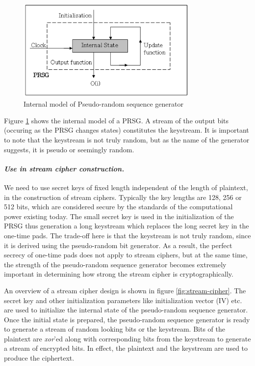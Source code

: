 \begin{figure}[ht!]
	\centering
		\includegraphics[width=3.5in]{./figures/prsg.PNG}
	\caption{Internal model of Pseudo-random sequence generator}	
	\label{fig:prsg}
\end{figure}

Figure \ref{fig:prsg} shows the internal model of a PRSG. A stream of the output bits (occuring as the PRSG changes states) constitutes the keystream. It is important to note that the keystream is not truly random, but as the name of the generator suggests, it is pseudo or seemingly random. 

\paragraph{\textit{Use in stream cipher construction.}}
\label{para:stream-construction} 
We need to use secret keys of fixed length independent of the length of plaintext, in the construction of stream ciphers. Typically the key lengths are 128, 256 or 512 bits, which are considered secure by the standards of the computational power existing today. %
The small secret key is used in the initialization of the PRSG thus generation a long keystream which replaces the long secret key in the one-time pads. The trade-off here is that the keystream is not truly random, since it is derived using the pseudo-random bit generator. As a result, the perfect secrecy of one-time pads does not apply to stream ciphers, but at the same time, the strength of the pseudo-random sequence generator becomes extremely important in determining how strong the stream cipher is cryptographically.

An overview of a stream cipher design is shown in figure \ref{fig:stream-cipher}. The secret key and other initialization parameters like initialization vector (IV) etc. are used to initialize the internal state of the pseudo-random sequence generator. Once the initial state is prepared, the pseudo-random sequence generator is ready to generate a stream of random looking bits or the keystream. Bits of the plaintext are \emph{xor}'ed along with corresponding bits from the keystream to generate a stream of encrypted bits. In effect, the plaintext and the keystream are used to produce the ciphertext.

